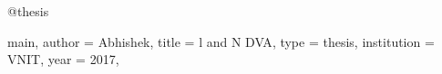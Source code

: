 @thesis{main,
author = {Abhishek},
title = {l and N DVA},
type = {thesis},
institution = {VNIT},
year = {2017},

}

